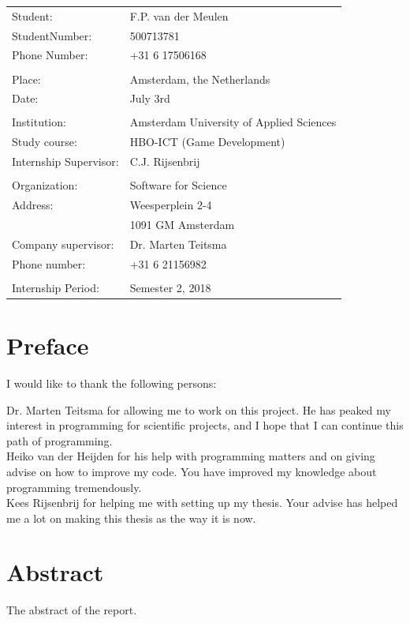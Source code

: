 \documentclass[paper=a4, fontsize=11pt,twoside]{scrartcl}	%
\begin{document}
\newpage 
\begin{longtable}{  p{8cm}  p{8cm} }
Student: & F.P. van der Meulen \\
StudentNumber: & 500713781 \\
Phone Number: & +31 6 17506168 \\
\\
Place: & Amsterdam, the Netherlands \\
Date: & July 3rd \\
\\
Institution: & Amsterdam University of Applied Sciences \\
Study course: & HBO-ICT (Game Development) \\
Internship Supervisor: & C.J. Rijsenbrij \\
\\
Organization: & Software for Science \\
Address: & Weesperplein 2-4 \\
 & 1091 GM Amsterdam \\
Company supervisor: & Dr. Marten Teitsma \\
Phone number: & +31 6 21156982\\
\\
Internship Period: & Semester 2, 2018 

\end{longtable}
\newpage



\newpage
\tableofcontents

\newpage
\section*{Preface}
I would like to thank the following persons:

Dr. Marten Teitsma for allowing me to work on this project. He has peaked my interest in programming for scientific projects, and I hope that I can continue this path of programming.\\
Heiko van der Heijden for his help with programming matters and on giving advise on how to improve my code. You have improved my knowledge about programming tremendously. \\
Kees Rijsenbrij for helping me with setting up my thesis. Your advise has helped me a lot on making this thesis as the way it is now.


\newpage
\section*{Abstract}
The abstract of the report.
\newpage
\end{document}

